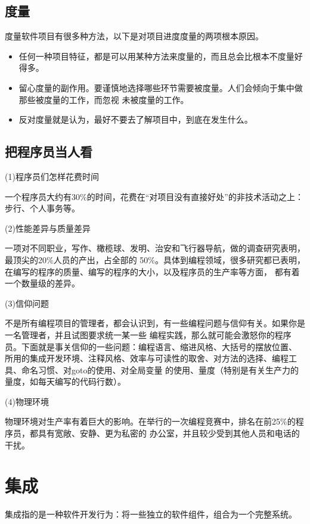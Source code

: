 \documentclass{article}
\begin{document}
\subsection{度量}
度量软件项目有很多种方法，以下是对项目进度度量的两项根本原因。
\begin{itemize}
    \item 任何一种项目特征，都是可以用某种方法来度量的，而且总会比根本不度量好得多。
    \item 留心度量的副作用。要谨慎地选择哪些环节需要被度量。人们会倾向于集中做那些被度量的工作，而忽视
    未被度量的工作。
    \item 反对度量就是认为，最好不要去了解项目中，到底在发生什么。
\end{itemize}

\subsection{把程序员当人看}
\par
(1)程序员们怎样花费时间
\par
一个程序员大约有30\%的时间，花费在“对项目没有直接好处”的非技术活动之上：步行、个人事务等。

\par
(2)性能差异与质量差异
\par
一项对不同职业，写作、橄榄球、发明、治安和飞行器导航，做的调查研究表明，最顶尖的20\%人员的产出，占全部的
50\%。具体到编程领域，很多研究都已表明，在编写的程序的质量、编写的程序的大小，以及程序员的生产率等方面，
都有着一个数量级的差异。

\par
(3)信仰问题
\par
不是所有编程项目的管理者，都会认识到，有一些编程问题与信仰有关。如果你是一名管理者，并且试图要求统一某一些
编程实践，那么就可能会激怒你的程序员。下面就是事关信仰的一些问题：编程语言、缩进风格、大括号的摆放位置、
所用的集成开发环境、注释风格、效率与可读性的取舍、对方法的选择、编程工具、命名习惯、对goto的使用、对全局变量
的使用、量度（特别是有关生产力的量度，如每天编写的代码行数）。

\par
(4)物理环境
\par
物理环境对生产率有着巨大的影响。在举行的一次编程竞赛中，排名在前25\%的程序员，都具有宽敞、安静、更为私密的
办公室，并且较少受到其他人员和电话的干扰。


\section{集成}
集成指的是一种软件开发行为：将一些独立的软件组件，组合为一个完整系统。
\end{document}
